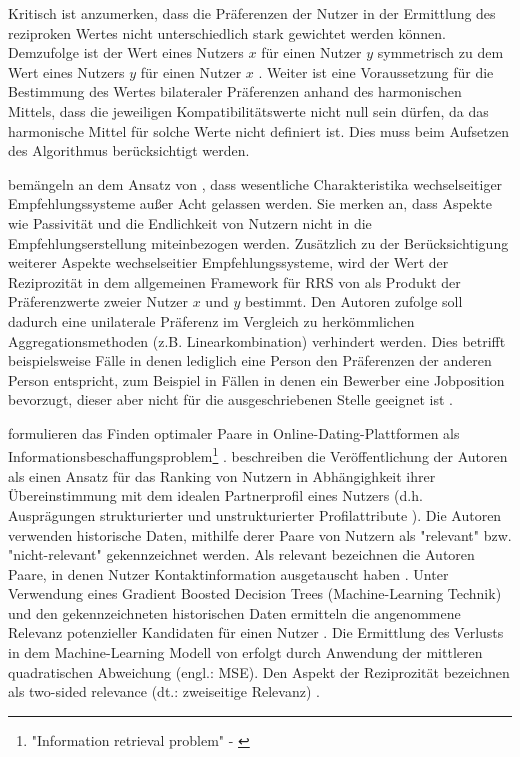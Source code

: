 
Kritisch ist anzumerken, dass die Präferenzen der Nutzer in der Ermittlung des reziproken Wertes nicht unterschiedlich stark gewichtet werden können.
Demzufolge ist der Wert eines Nutzers $x$ für einen Nutzer $y$ symmetrisch zu dem Wert eines Nutzers $y$ für einen Nutzer $x$ \cite[S. 211]{pizzato:2010}.
Weiter ist eine Voraussetzung für die Bestimmung des Wertes bilateraler Präferenzen anhand des harmonischen Mittels, dass die jeweiligen Kompatibilitätswerte nicht null sein dürfen, da das harmonische Mittel für solche Werte nicht definiert ist.
Dies muss beim Aufsetzen des Algorithmus berücksichtigt werden.

\textcite[S. 40]{li:inproceedings} bemängeln an dem Ansatz von \textcite[S. 207ff.]{pizzato:2010}, dass wesentliche Charakteristika wechselseitiger Empfehlungssysteme außer Acht gelassen werden.
Sie merken an, dass Aspekte wie Passivität und die Endlichkeit von Nutzern nicht in die Empfehlungserstellung miteinbezogen werden.
Zusätzlich zu der Berücksichtigung weiterer Aspekte wechselseitier Empfehlungssysteme, wird der Wert der Reziprozität in dem allgemeinen Framework für \ac{RRS} von \textcite[S. 38]{li:inproceedings} als Produkt der Präferenzwerte zweier Nutzer $x$ und $y$ bestimmt.
Den Autoren zufolge soll dadurch eine unilaterale Präferenz im Vergleich zu herkömmlichen Aggregationsmethoden (z.B. Linearkombination) verhindert werden.
Dies betrifft beispielsweise Fälle in denen lediglich eine Person den Präferenzen der anderen Person entspricht, zum Beispiel in Fällen in denen ein Bewerber eine Jobposition bevorzugt, dieser aber nicht für die ausgeschriebenen Stelle geeignet ist \cite[S. 38]{li:inproceedings}.

\textcite[S. 66ff.]{diaz:inproceedings} formulieren das Finden optimaler Paare in Online-Dating-Plattformen als Informationsbeschaffungsproblem\footnote{"Information retrieval problem" - \textcite[S. 67]{diaz:inproceedings}} \cite[S. 550]{koprinska:inbook}.
\textcite[S. 550]{koprinska:inbook} beschreiben die Veröffentlichung der Autoren als einen Ansatz für das Ranking von Nutzern in Abhängighkeit ihrer Übereinstimmung mit dem idealen Partnerprofil eines Nutzers (d.h. Ausprägungen strukturierter und unstrukturierter Profilattribute \cite[S. 288]{li:article}\cite[S. 272]{pizzato:2:inproceedings}).
Die Autoren verwenden historische Daten, mithilfe derer Paare von Nutzern als "relevant" bzw. "nicht-relevant" gekennzeichnet werden.
Als relevant bezeichnen die Autoren Paare, in denen Nutzer Kontaktinformation ausgetauscht haben \cite[S. 66ff.]{diaz:inproceedings}.
Unter Verwendung eines Gradient Boosted Decision Trees (Machine-Learning Technik) und den gekennzeichneten historischen Daten ermitteln \textcite[S. 69]{diaz:inproceedings} die angenommene Relevanz potenzieller Kandidaten für einen Nutzer \cite[S. 550]{koprinska:inbook}.
Die Ermittlung des Verlusts in dem Machine-Learning Modell von \textcite[S. 69]{diaz:inproceedings} erfolgt durch Anwendung der mittleren quadratischen Abweichung (engl.: \ac{MSE}).
Den Aspekt der Reziprozität bezeichnen \textcite[S. 66]{diaz:inproceedings} als two-sided relevance (dt.: zweiseitige Relevanz) \cite[S. 550]{koprinska:inbook}.

